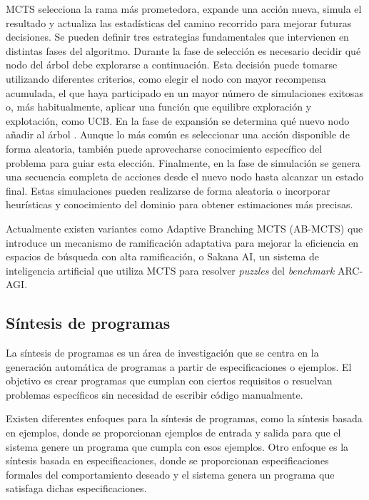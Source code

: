 \documentclass[11pt,a4paper,spanish]{book}
\numberwithin{equation}{chapter}
\numberwithin{figure}{chapter}
\begin{document}
\FloatBarrier

MCTS selecciona la rama más prometedora, expande una acción nueva, simula el resultado y actualiza las estadísticas del camino recorrido para mejorar futuras decisiones.
Se pueden definir tres estrategias fundamentales que intervienen en distintas fases del algoritmo. Durante la fase de selección es necesario decidir 
qué nodo del árbol debe explorarse a continuación. Esta decisión puede tomarse utilizando diferentes criterios, como elegir el nodo con mayor recompensa acumulada,
el que haya participado en un mayor número de simulaciones exitosas o, más habitualmente, aplicar una función que equilibre exploración y explotación, como UCB.
En la fase de expansión se determina qué nuevo nodo añadir al árbol \cite{perez2014knowledge}. Aunque lo más común es seleccionar una acción disponible de forma aleatoria,
también puede aprovecharse conocimiento específico del problema para guiar esta elección. Finalmente, en la fase de simulación se genera una secuencia completa de
acciones desde el nuevo nodo hasta alcanzar un estado final. Estas simulaciones pueden realizarse de forma aleatoria o incorporar heurísticas y conocimiento del
dominio para obtener estimaciones más precisas.

Actualmente existen variantes como Adaptive Branching MCTS (AB-MCTS) que introduce un mecanismo de ramificación adaptativa para mejorar la eficiencia en espacios 
de búsqueda con alta ramificación, o Sakana AI, un sistema de inteligencia artificial que utiliza MCTS para resolver \textit{puzzles} del \textit{benchmark} ARC-AGI.

\subsection{Síntesis de programas}

La síntesis de programas es un área de investigación que se centra en la generación automática de programas a partir de especificaciones o ejemplos. 
El objetivo es crear programas que cumplan con ciertos requisitos o resuelvan problemas específicos sin necesidad de escribir código manualmente.

Existen diferentes enfoques para la síntesis de programas, como la síntesis basada en ejemplos, donde se proporcionan ejemplos de entrada y salida para que 
el sistema genere un programa que cumpla con esos ejemplos. Otro enfoque es la síntesis basada en especificaciones, donde se proporcionan especificaciones formales del
comportamiento deseado y el sistema genera un programa que satisfaga dichas especificaciones.
\end{document}
